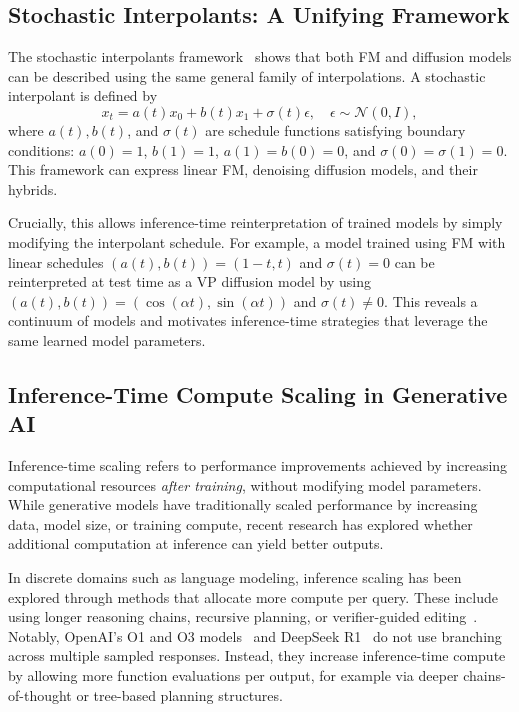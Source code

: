 \documentclass{article}
\begin{document}
\subsection{Stochastic Interpolants: A Unifying Framework}

The stochastic interpolants framework~\cite{ma2024sit} shows that both FM and diffusion models can be described using the same general family of interpolations. A stochastic interpolant is defined by
\[
x_t = a(t) x_0 + b(t) x_1 + \sigma(t) \epsilon, \quad \epsilon \sim \mathcal{N}(0, I),
\]
where \(a(t), b(t)\), and \(\sigma(t)\) are schedule functions satisfying boundary conditions: \(a(0) = 1\), \(b(1) = 1\), \(a(1) = b(0) = 0\), and \(\sigma(0) = \sigma(1) = 0\). This framework can express linear FM, denoising diffusion models, and their hybrids.

Crucially, this allows inference-time reinterpretation of trained models by simply modifying the interpolant schedule. For example, a model trained using FM with linear schedules \((a(t), b(t)) = (1 - t, t)\) and \(\sigma(t) = 0\) can be reinterpreted at test time as a VP diffusion model by using \((a(t), b(t)) = (\cos(\alpha t), \sin(\alpha t))\) and \(\sigma(t) \neq 0\). This reveals a continuum of models and motivates inference-time strategies that leverage the same learned model parameters.

\subsection{Inference-Time Compute Scaling in Generative AI}

Inference-time scaling refers to performance improvements achieved by increasing computational resources \emph{after training}, without modifying model parameters. While generative models have traditionally scaled performance by increasing data, model size, or training compute, recent research has explored whether additional computation at inference can yield better outputs.

In discrete domains such as language modeling, inference scaling has been explored through methods that allocate more compute per query. These include using longer reasoning chains, recursive planning, or verifier-guided editing~\cite{gandhi2024sos, cobbe2021verifiers, lightman2023verify, brown2024llmmonkeys}. Notably, OpenAI's O1 and O3 models~\cite{openai2024o1} and DeepSeek R1~\cite{deepseek2024r1} do not use branching across multiple sampled responses. Instead, they increase inference-time compute by allowing more function evaluations per output, for example via deeper chains-of-thought or tree-based planning structures.
\end{document}
